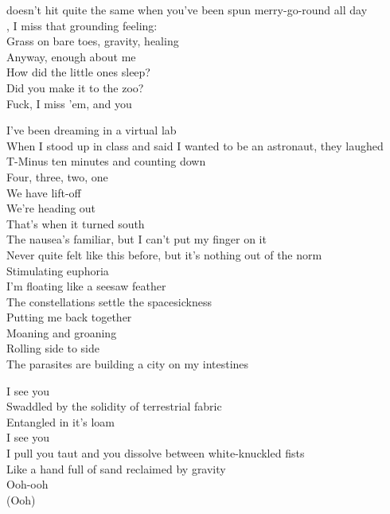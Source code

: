  doesn't hit quite the same when you've been spun merry-go-round all day \\
, I miss that grounding feeling: \\
Grass on bare toes, gravity, healing \\
Anyway, enough about me \\
How did the little ones sleep? \\
Did you make it to the zoo? \\
Fuck, I miss 'em, and you \\


I've been dreaming in a virtual lab \\
When I stood up in class and said I wanted to be an astronaut, they laughed \\
T-Minus ten minutes and counting down \\
Four, three, two, one \\
We have lift-off \\
We're heading out \\
That's when it turned south \\

The nausea's familiar, but I can't put my finger on it \\
Never quite felt like this before, but it's nothing out of the norm \\
Stimulating euphoria \\
I'm floating like a seesaw feather \\
The constellations settle the spacesickness \\
Putting me back together \\

Moaning and groaning \\
Rolling side to side \\
The parasites are building a city on my intestines \\


I see you \\
Swaddled by the solidity of terrestrial fabric \\
Entangled in it's loam \\
I see you \\
I pull you taut and you dissolve between white-knuckled fists \\
Like a hand full of sand reclaimed by gravity \\
Ooh-ooh \\
(Ooh) \\

